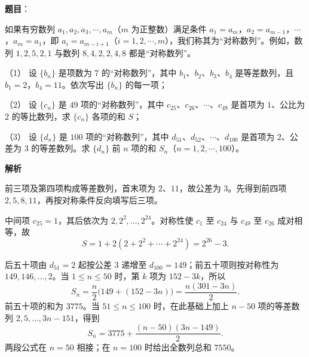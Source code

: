 \begin{answer}

\textbf{题目}：

如果有穷数列 $a_1,a_2,a_3,\cdots,a_m$（$m$ 为正整数）满足条件 $a_1=a_m$，$a_2=a_{m-1}$，$\cdots$，$a_m=a_1$，即 $a_i=a_{m-i+1}$（$i=1,2,\cdots,m$），我们称其为“对称数列”。例如，数列 $1,2,5,2,1$ 与数列 $8,4,2,2,4,8$ 都是“对称数列”。

（1） 设 $\{b_n\}$ 是项数为 $7$ 的“对称数列”，其中 $b_1$、$b_2$、$b_3$、$b_4$ 是等差数列，且 $b_1=2$，$b_4=11$。依次写出 $\{b_n\}$ 的每一项；

（2） 设 $\{c_n\}$ 是 $49$ 项的“对称数列”，其中 $c_{25}$、$c_{26}$、$\cdots$、$c_{49}$ 是首项为 $1$、公比为 $2$ 的等比数列，求 $\{c_n\}$ 各项的和 $S$；

（3） 设 $\{d_n\}$ 是 $100$ 项的“对称数列”，其中 $d_{51}$、$d_{52}$、$\cdots$、$d_{100}$ 是首项为 $2$、公差为 $3$ 的等差数列。求 $\{d_n\}$ 前 $n$ 项的和 $S_n$（$n=1,2,\cdots,100$）。

\textbf{解析}


前三项及第四项构成等差数列，首末项为 $2$、$11$，故公差为 $3$。先得到前四项 $2,5,8,11$，再按对称条件反向填写后三项。


中间项 $c_{25}=1$，其后依次为 $2,2^2,\ldots,2^{24}$。对称性使 $c_1$ 至 $c_{24}$ 与 $c_{49}$ 至 $c_{26}$ 成对相等，故
\nopagebreak[4]
\[
S=1+2(2+2^2+\cdots+2^{24})=2^{26}-3.
\]


后五十项由 $d_{51}=2$ 起按公差 $3$ 递增至 $d_{100}=149$；前五十项则按对称性为 $149,146,\ldots,2$。当 $1\le n\le50$ 时，第 $k$ 项为 $152-3k$，所以
\nopagebreak[4]
\[
S_n=\frac n2\bigl(149+(152-3n)\bigr)=\frac{n(301-3n)}2.
\]
前五十项的和为 $3775$。当 $51\le n\le100$ 时，在此基础上加上 $n-50$ 项的等差数列 $2,5,\ldots,3n-151$，得到
\nopagebreak[4]
\[
S_n=3775+\frac{(n-50)(3n-149)}2.
\]
两段公式在 $n=50$ 相接；在 $n=100$ 时给出全数列总和 $7550$。




\end{answer}
